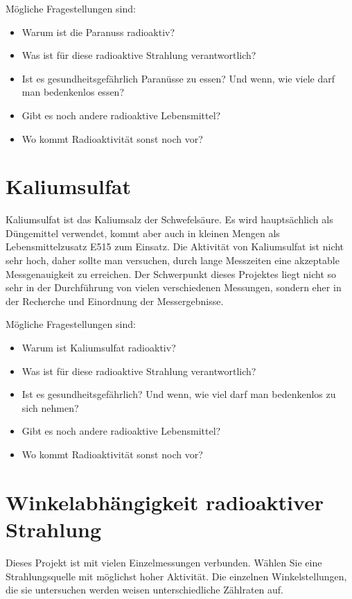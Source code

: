 \documentclass[12pt,a4paper, twosite]{article}
\begin{document}
Mögliche Fragestellungen sind:
\begin{itemize}
	\item Warum ist die Paranuss radioaktiv?
	\item Was ist für diese radioaktive Strahlung verantwortlich?
	\item Ist es gesundheitsgefährlich Paranüsse zu essen? Und wenn, wie viele darf man bedenkenlos essen?
	\item Gibt es noch andere radioaktive Lebensmittel?
	\item Wo kommt Radioaktivität sonst noch vor?
\end{itemize}



\newpage

\section*{Kaliumsulfat}
Kaliumsulfat ist das Kaliumsalz der Schwefelsäure. Es wird hauptsächlich als Düngemittel verwendet, kommt aber auch
in kleinen Mengen als Lebensmittelzusatz E515 zum Einsatz.
Die Aktivität von Kaliumsulfat ist nicht sehr hoch, daher sollte man versuchen, durch lange Messzeiten 
eine akzeptable Messgenauigkeit zu erreichen. Der Schwerpunkt dieses Projektes liegt nicht so sehr in
der Durchführung von vielen verschiedenen Messungen, sondern eher in der Recherche und Einordnung der Messergebnisse. 

Mögliche Fragestellungen sind:
\begin{itemize}
	\item Warum ist Kaliumsulfat radioaktiv?
	\item Was ist für diese radioaktive Strahlung verantwortlich?
	\item Ist es gesundheitsgefährlich? Und wenn, wie viel darf man bedenkenlos zu sich nehmen? 
	\item Gibt es noch andere radioaktive Lebensmittel?
	\item Wo kommt Radioaktivität sonst noch vor?
\end{itemize}
\newpage

\section*{Winkelabhängigkeit radioaktiver Strahlung}
Dieses Projekt ist mit vielen Einzelmessungen verbunden. Wählen Sie eine Strahlungsquelle mit möglichst hoher
Aktivität. Die einzelnen Winkelstellungen, die sie untersuchen werden weisen unterschiedliche Zählraten auf.
\end{document}
